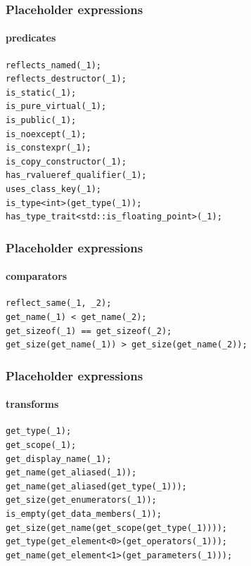 \documentclass[compress,table,xcolor=table]{beamer}
\begin{document}
\begin{frame}[fragile]
  \frametitle{Placeholder expressions}
  \framesubtitle{predicates}
  \begin{lstlisting}[language=c++2x,basicstyle=\small\ttfamily]
reflects_named(_1);
reflects_destructor(_1);
is_static(_1);
is_pure_virtual(_1);
is_public(_1);
is_noexcept(_1);
is_constexpr(_1);
is_copy_constructor(_1);
has_rvalueref_qualifier(_1);
uses_class_key(_1);
is_type<int>(get_type(_1));
has_type_trait<std::is_floating_point>(_1);
  \end{lstlisting}
\end{frame}
\begin{frame}[fragile]
  \frametitle{Placeholder expressions}
  \framesubtitle{comparators}
  \begin{lstlisting}[language=c++2x,basicstyle=\small\ttfamily]
reflect_same(_1, _2);
get_name(_1) < get_name(_2);
get_sizeof(_1) == get_sizeof(_2);
get_size(get_name(_1)) > get_size(get_name(_2));
  \end{lstlisting}
\end{frame}
\begin{frame}[fragile]
  \frametitle{Placeholder expressions}
  \framesubtitle{transforms}
  \begin{lstlisting}[language=c++2x,basicstyle=\small\ttfamily]
get_type(_1);
get_scope(_1);
get_display_name(_1);
get_name(get_aliased(_1));
get_name(get_aliased(get_type(_1)));
get_size(get_enumerators(_1));
is_empty(get_data_members(_1));
get_size(get_name(get_scope(get_type(_1))));
get_type(get_element<0>(get_operators(_1)));
get_name(get_element<1>(get_parameters(_1)));
  \end{lstlisting}
\end{frame}
\end{document}
